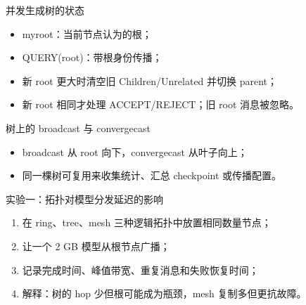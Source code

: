 \documentclass[UTF8,fontset=none,aspectratio=169,10pt]{beamer}
\begin{document}
\begin{frame}{并发生成树的状态}
\begin{itemize}
  \item myroot：当前节点认为的根；
  \item QUERY(root)：带根身份传播；
  \item 新 root 更大时清空旧 Children/Unrelated 并切换 parent；
  \item 新 root 相同才处理 ACCEPT/REJECT；旧 root 消息被忽略。
\end{itemize}
\end{frame}

\begin{frame}{树上的 broadcast 与 convergecast}
\begin{center}
\end{center}
\begin{itemize}
  \item broadcast 从 root 向下，convergecast 从叶子向上；
  \item 同一棵树可复用来收集统计、汇总 checkpoint 或传播配置。
\end{itemize}
\end{frame}


\begin{frame}{实验一：拓扑对模型分发延迟的影响}
\begin{enumerate}
  \item 在 ring、tree、mesh 三种逻辑拓扑中放置相同数量节点；
  \item 让一个 2 GB 模型从根节点广播；
  \item 记录完成时间、峰值带宽、重复消息和失败恢复时间；
  \item 解释：树的 hop 少但根可能成为瓶颈，mesh 复制多但更抗故障。
\end{enumerate}
\end{frame}
\end{document}

